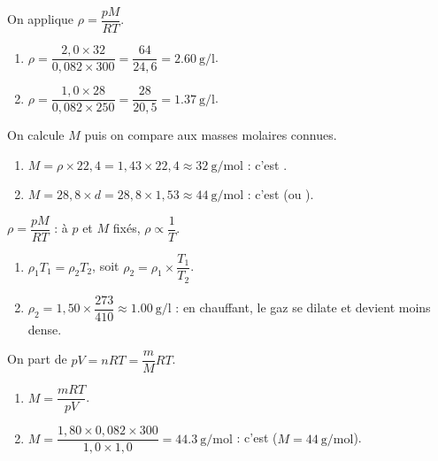 \documentclass[11pt,a4paper]{article}
\begin{document}
\begin{corrige}
On applique $\rho=\dfrac{pM}{RT}$.
\begin{enumerate}[label=\alph*)]
  \item $\rho=\dfrac{2{,}0\times32}{0{,}082\times300}=\dfrac{64}{24{,}6}=\qty{2.60}{\gram\per\litre}$.
  \item $\rho=\dfrac{1{,}0\times28}{0{,}082\times250}=\dfrac{28}{20{,}5}=\qty{1.37}{\gram\per\litre}$.
\end{enumerate}
\end{corrige}

\begin{corrige}
On calcule $M$ puis on compare aux masses molaires connues.
\begin{enumerate}[label=\alph*)]
  \item $M=\rho\times22{,}4=1{,}43\times22{,}4\approx\qty{32}{\gram\per\mole}$ : c'est .
  \item $M=28{,}8\times d=28{,}8\times1{,}53\approx\qty{44}{\gram\per\mole}$ : c'est 
        (ou ).
\end{enumerate}
\end{corrige}

\begin{corrige}
$\rho=\dfrac{pM}{RT}$ : à $p$ et $M$ fixés, $\rho\propto\dfrac{1}{T}$.
\begin{enumerate}[label=\alph*)]
  \item $\rho_1 T_1=\rho_2 T_2$, soit $\rho_2=\rho_1\times\dfrac{T_1}{T_2}$.
  \item $\rho_2=1{,}50\times\dfrac{273}{410}\approx\qty{1.00}{\gram\per\litre}$ : en chauffant, le gaz
        se dilate et devient moins dense.
\end{enumerate}
\end{corrige}

\begin{corrige}
On part de $pV=nRT=\dfrac{m}{M}RT$.
\begin{enumerate}[label=\alph*)]
  \item $M=\dfrac{mRT}{pV}$.
  \item $M=\dfrac{1{,}80\times0{,}082\times300}{1{,}0\times1{,}0}=\qty{44.3}{\gram\per\mole}$ :
        c'est  ($M=\qty{44}{\gram\per\mole}$).
\end{enumerate}
\end{corrige}
\end{document}
